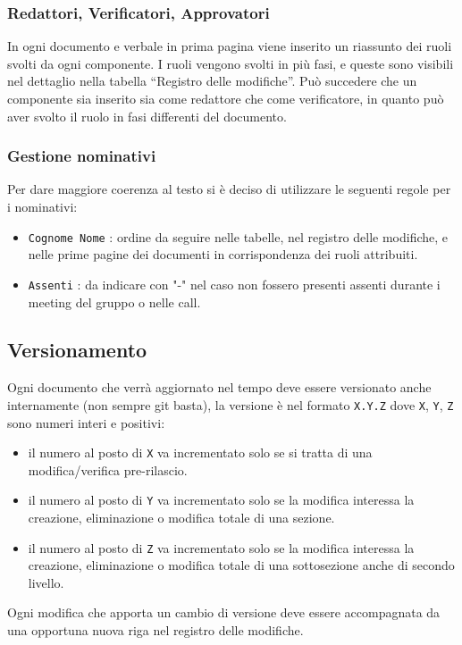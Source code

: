 \subsubsection{Redattori, Verificatori, Approvatori}
In ogni documento e verbale in prima pagina viene inserito un riassunto dei ruoli svolti da ogni componente. I ruoli vengono svolti in più fasi, e queste sono visibili nel dettaglio nella tabella ``Registro delle modifiche''. Può succedere che un componente sia inserito sia come redattore che come verificatore, in quanto può aver svolto il ruolo in fasi differenti del documento.


\subsubsection{Gestione nominativi}
Per dare maggiore coerenza al testo si è deciso di utilizzare le seguenti regole per i nominativi:
\begin{itemize}
	\item \texttt{Cognome Nome} : ordine da seguire nelle tabelle, nel registro delle modifiche, e nelle prime pagine dei documenti in corrispondenza dei ruoli attribuiti.
	\item \texttt{Assenti} : da indicare con "-" nel caso non fossero presenti assenti durante i meeting del gruppo o nelle call.
\end{itemize}

\subsection{Versionamento}
Ogni documento che verrà aggiornato nel tempo deve essere versionato anche
internamente (non sempre git basta), la versione è nel formato \texttt{X.Y.Z} dove
\texttt{X}, \texttt{Y}, \texttt{Z} sono numeri interi e positivi:
\begin{itemize}
    \item il numero al posto di \texttt{X} va incrementato solo se si tratta di una
    modifica/verifica pre-rilascio.
    \item il numero al posto di \texttt{Y} va incrementato solo se la modifica
    interessa la creazione, eliminazione o modifica totale di una sezione.
    \item il numero al posto di \texttt{Z} va incrementato solo se la modifica
    interessa la creazione, eliminazione o modifica totale di una sottosezione
    anche di secondo livello.
\end{itemize}
Ogni modifica che apporta un cambio di versione deve essere accompagnata da una
opportuna nuova riga nel registro delle modifiche.
\\

